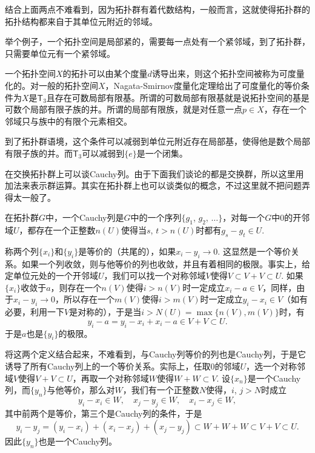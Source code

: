 结合上面两点不难看到，因为拓扑群有着代数结构，一般而言，这就使得拓扑群的拓扑结构都来自于其单位元附近的邻域。

举个例子，一个拓扑空间是局部紧的，需要每一点处有一个紧邻域，到了拓扑群，只需要单位元有一个紧邻域。

\begin{para}
一个拓扑空间$X$的拓扑可以由某个度量$d$诱导出来，则这个拓扑空间被称为可度量化的。对一般的拓扑空间$X$，Nagata-Smirnov度量化定理给出了可度量化的等价条件为$X$是$\mathsf{T}_3$且存在可数局部有限基。所谓的可数局部有限基就是说拓扑空间的基是可数个局部有限子族的并。所谓的局部有限族，就是对任意一点$p\in X$，存在一个邻域只与族中的有限个元素相交。

到了拓扑群语境，这个条件可以减弱到单位元附近存在局部基，使得他是数个局部有限子族的并。而$\mathsf{T}_3$可以减弱到$\{e\}$是一个闭集。
\end{para}

\begin{para}
在交换拓扑群上可以谈Cauchy列。由于下面我们谈论的都是交换群，所以这里用加法来表示群运算。其实在拓扑群上也可以谈类似的概念，不过这里就不把问题弄得太一般了。

在拓扑群$G$中，一个Cauchy列是$G$中的一个序列$\{g_1$, $g_2$, $\dots\}$，对每一个$G$中$0$的开邻域$U$，都存在一个正整数$n(U)$使得当$s$, $t>n(U)$时都有$g_s-g_t\in U$. 

称两个列$\{x_i\}$和$\{y_i\}$是等价的（共尾的），如果$x_i-y_i\to 0$. 这显然是一个等价关系。如果一个列收敛，则与他等价的列也收敛，并且有着相同的极限。事实上，给定单位元处的一个开邻域$U$，我们可以找一个对称邻域$V$使得$V\subset V+V\subset U$. 如果$\{x_i\}$收敛于$a$，则存在一个$n(V)$使得$i>n(V)$时一定成立$x_i-a\in V$，同样，由于$x_i-y_i\to 0$，所以存在一个$m(V)$使得$i>m(V)$时一定成立$y_i-x_i\in V$（如有必要，利用一下$V$是对称的），于是当$i>N(U)=\max\{n(V),m(V)\}$时，有
\[
	y_i-a=y_i-x_i+x_i-a\in V+V\subset U.
\]
于是$a$也是$\{y_i\}$的极限。

将这两个定义结合起来，不难看到，与Cauchy列等价的列也是Cauchy列，于是它诱导了所有Cauchy列上的一个等价关系。实际上，任取$0$的邻域$U$，选一个对称邻域$V$使得$V+V\subset U$，再取一个对称邻域$W$使得$W+W\subset V$. 设$\{x_n\}$是一个Cauchy列，而$\{y_n\}$与他等价，那么对$W$，我们有一个正整数$N$使得，$i$, $j>N$时成立
\[
	y_i-x_i\in W,\quad x_j-y_j\in W,\quad x_i-x_j\in W,
\]
其中前两个是等价，第三个是Cauchy列的条件，于是
\[
	y_i-y_j=(y_i-x_i)+(x_i-x_j)+(x_j-y_j)\subset W+W+W\subset V+V\subset U.
\]
因此$\{y_n\}$也是一个Cauchy列。

\end{para}

